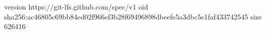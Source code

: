 version https://git-lfs.github.com/spec/v1
oid sha256:ac46805c69bb84ed02f966ef3b28f69496898dbeefe5a3dbc5e1faf433742545
size 626416
